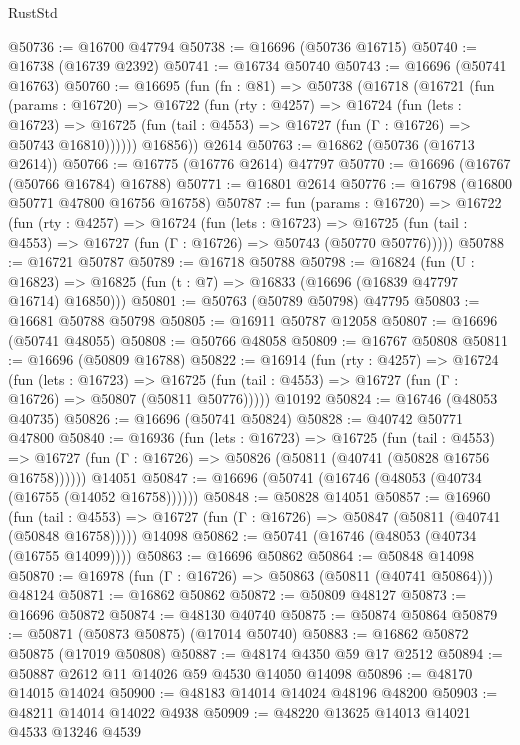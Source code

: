 \begin{lexlean}{RustStd}
\begin{coremodule}
@50736 := @16700 @47794
@50738 := @16696 (@50736 @16715)
@50740 := @16738 (@16739 @2392)
@50741 := @16734 @50740
@50743 := @16696 (@50741 @16763)
@50760 := @16695
    (fun (fn : @81) =>
    @50738
      (@16718
        (@16721
          (fun (params : @16720) =>
          @16722
            (fun (rty : @4257) =>
            @16724
              (fun (lets : @16723) =>
              @16725 (fun (tail : @4553) => @16727 (fun (Γ : @16726) => @50743 @16810))))))
        @16856))
    @2614
@50763 := @16862 (@50736 (@16713 @2614))
@50766 := @16775 (@16776 @2614) @47797
@50770 := @16696 (@16767 (@50766 @16784) @16788)
@50771 := @16801 @2614
@50776 := @16798 (@16800 @50771 @47800 @16756 @16758)
@50787 := fun (params : @16720) =>
  @16722
    (fun (rty : @4257) =>
    @16724
      (fun (lets : @16723) =>
      @16725 (fun (tail : @4553) => @16727 (fun (Γ : @16726) => @50743 (@50770 @50776)))))
@50788 := @16721 @50787
@50789 := @16718 @50788
@50798 := @16824
    (fun (U : @16823) => @16825 (fun (t : @7) => @16833 (@16696 (@16839 @47797 @16714) @16850)))
@50801 := @50763 (@50789 @50798) @47795
@50803 := @16681 @50788 @50798
@50805 := @16911 @50787 @12058
@50807 := @16696 (@50741 @48055)
@50808 := @50766 @48058
@50809 := @16767 @50808
@50811 := @16696 (@50809 @16788)
@50822 := @16914
    (fun (rty : @4257) =>
    @16724
      (fun (lets : @16723) =>
      @16725 (fun (tail : @4553) => @16727 (fun (Γ : @16726) => @50807 (@50811 @50776)))))
    @10192
@50824 := @16746 (@48053 @40735)
@50826 := @16696 (@50741 @50824)
@50828 := @40742 @50771 @47800
@50840 := @16936
    (fun (lets : @16723) =>
    @16725
      (fun (tail : @4553) =>
      @16727 (fun (Γ : @16726) => @50826 (@50811 (@40741 (@50828 @16756 @16758))))))
    @14051
@50847 := @16696 (@50741 (@16746 (@48053 (@40734 (@16755 (@14052 @16758))))))
@50848 := @50828 @14051
@50857 := @16960
    (fun (tail : @4553) => @16727 (fun (Γ : @16726) => @50847 (@50811 (@40741 (@50848 @16758)))))
    @14098
@50862 := @50741 (@16746 (@48053 (@40734 (@16755 @14099))))
@50863 := @16696 @50862
@50864 := @50848 @14098
@50870 := @16978 (fun (Γ : @16726) => @50863 (@50811 (@40741 @50864))) @48124
@50871 := @16862 @50862
@50872 := @50809 @48127
@50873 := @16696 @50872
@50874 := @48130 @40740
@50875 := @50874 @50864
@50879 := @50871 (@50873 @50875) (@17014 @50740)
@50883 := @16862 @50872 @50875 (@17019 @50808)
@50887 := @48174 @4350 @59 @17 @2512
@50894 := @50887 @2612 @11 @14026 @59 @4530 @14050 @14098
@50896 := @48170 @14015 @14024
@50900 := @48183 @14014 @14024 @48196 @48200
@50903 := @48211 @14014 @14022 @4938
@50909 := @48220 @13625 @14013 @14021 @4533 @13246 @4539

\end{coremodule}
\end{lexlean}
